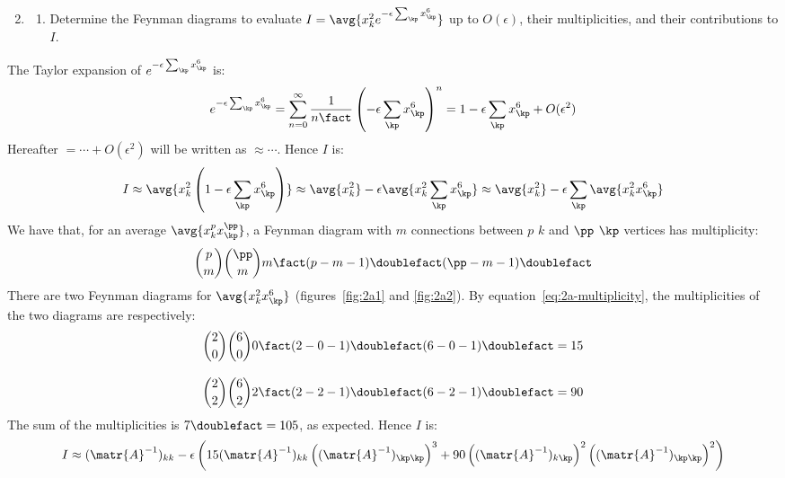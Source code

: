 \begin{enumerate}[leftmargin=0cm]
  \setcounter{enumi}{1}
  \item
        \begin{enumerate}
          \item \label{2a}
                Determine the Feynman diagrams to evaluate $I = \avg{x_k^2 e^{- \epsilon
                        \sum_\kp x_\kp^6 }}$ up to $O(\epsilon)$, their multiplicities, and their
                contributions to $I$.
        \end{enumerate}
\end{enumerate}

The Taylor expansion of $e^{-\epsilon \sum_\kp x_\kp^6}$ is:
\begin{equation*}
  e^{-\epsilon \sum_\kp x_\kp^6}
  = \sum_{n=0}^{\infty} \frac{1}{n\fact} \left( -\epsilon \sum_\kp x_\kp^6 \right)^n
  = 1 - \epsilon \sum_\kp x_\kp^6 + O(\epsilon^2)
\end{equation*}
Hereafter $=\cdots + O(\epsilon^2)$ will be written as $\approx\cdots$.
Hence $I$ is:
\begin{equation*}
  I \approx \avg{x_k^2 \left(1 - \epsilon \sum_\kp x_\kp^6 \right)} \approx
  \avg{x_k^2} - \epsilon \avg{x_k^2 \sum_\kp x_\kp^6} \approx \avg{x_k^2} -
  \epsilon \sum_\kp \avg{x_k^2 x_\kp^6}
\end{equation*}
We have that, for an average $\avg{x_k^p x_\kp^\pp}$, a Feynman diagram with $m$
connections between $p$ $k$ and $\pp$ $\kp$ vertices has multiplicity:
\begin{equation}{}
  \label{eq:2a-multiplicity}
  \binom{p}{m} \binom{\pp}{m} m\fact (p - m - 1)\doublefact (\pp - m - 1)\doublefact
\end{equation}
There are two Feynman diagrams for $\avg{x_k^2 x_\kp^6}$ (figures~\ref{fig:2a1}
and \ref{fig:2a2}).
By equation~\ref{eq:2a-multiplicity}, the multiplicities of the two diagrams are
respectively:
\begin{align*}{}
  \binom{2}{0} \binom{6}{0} 0\fact (2 - 0 - 1)\doublefact (6 - 0 - 1)\doublefact & = 15
  \\[2ex]
  \binom{2}{2} \binom{6}{2} 2\fact (2 - 2 - 1)\doublefact (6 - 2 - 1)\doublefact & = 90
\end{align*}
The sum of the multiplicities is $7\doublefact = 105$, as expected.
Hence $I$ is:
\begin{equation*}
  I \approx
  (\matr{A}^{-1})_{kk} - \epsilon \left(
  15 (\matr{A}^{-1})_{kk} \left((\matr{A}^{-1})_{\kp\kp}\right)^3 +
  90 \left((\matr{A}^{-1})_{k\kp}\right)^2 \left((\matr{A}^{-1})_{\kp\kp}\right)^2
  \right)
\end{equation*}

